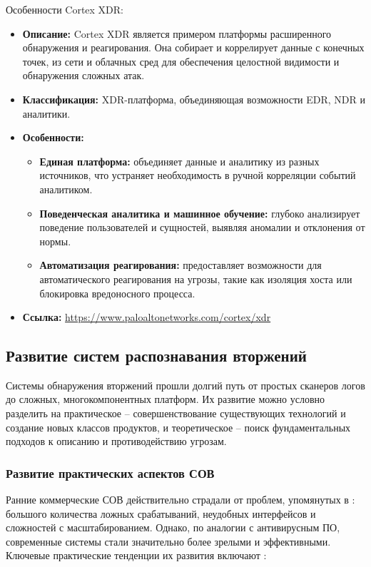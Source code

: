 Особенности Cortex XDR:
\begin{itemize}
		\item \textbf{Описание:} Cortex XDR является примером платформы расширенного обнаружения и реагирования. Она собирает и коррелирует данные с конечных точек, из сети и облачных сред для обеспечения целостной видимости и обнаружения сложных атак.
    \item \textbf{Классификация:} XDR-платформа, объединяющая возможности EDR, NDR и аналитики.
    \item \textbf{Особенности:}
    \begin{itemize}
        \item \textbf{Единая платформа:} объединяет данные и аналитику из разных источников, что устраняет необходимость в ручной корреляции событий аналитиком.
        \item \textbf{Поведенческая аналитика и машинное обучение:} глубоко анализирует поведение пользователей и сущностей, выявляя аномалии и отклонения от нормы.
        \item \textbf{Автоматизация реагирования:} предоставляет возможности для автоматического реагирования на угрозы, такие как изоляция хоста или блокировка вредоносного процесса.
    \end{itemize}
    \item \textbf{Ссылка:} \url{https://www.paloaltonetworks.com/cortex/xdr}
\end{itemize}


\subsection{Развитие систем распознавания вторжений}

Системы обнаружения вторжений прошли долгий путь от простых сканеров логов до сложных, многокомпонентных платформ. Их развитие можно условно разделить на практическое -- совершенствование существующих технологий и создание новых классов продуктов, и теоретическое -- поиск фундаментальных подходов к описанию и противодействию угрозам.

\subsubsection{Развитие практических аспектов СОВ}

Ранние коммерческие СОВ действительно страдали от проблем, упомянутых в \autocite{IDSClassification}: большого количества ложных срабатываний, неудобных интерфейсов и сложностей с масштабированием. Однако, по аналогии с антивирусным ПО, современные системы стали значительно более зрелыми и эффективными. Ключевые практические тенденции их развития включают \cite{IDSBranitsky}:

